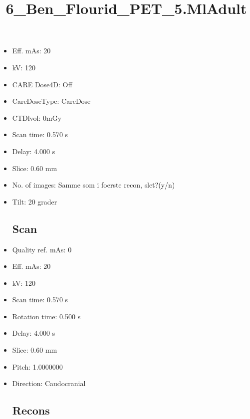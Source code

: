\documentclass[12pt]{article}
\title{6\_Ben\_Flourid\_PET\_5.MlAdult}
\begin{document}
\maketitle
\newpage
\tableofcontents
\newpage
{}


\begin{itemize}
\section{Topogram Ben}
\subsection{Routine}
\item Eff. mAs: 20\item kV: 120\item CARE Dose4D: Off\item CareDoseType: CareDose\item CTDlvol: 0mGy\item Scan time: 0.570 s\item Delay: 4.000 s\item Slice: 0.60 mm\item No. of images: Samme som i foerste recon, slet?(y/n)\item Tilt: 20 grader
\subsection{Scan}
\item Quality ref. mAs: 0\item Eff. mAs: 20\item kV: 120\item Scan time: 0.570 s\item Rotation time: 0.500 s\item Delay: 4.000 s\item Slice: 0.60 mm\item Pitch: 1.0000000\item Direction: Caudocranial\subsection{Recons}


\end{itemize}
\end{document}
